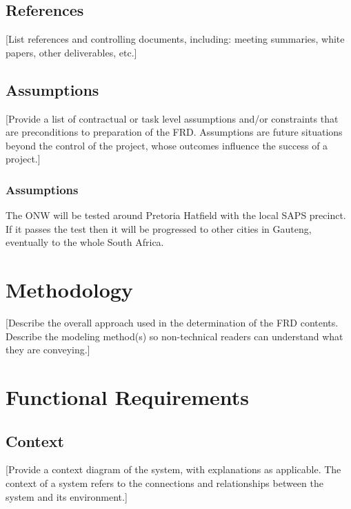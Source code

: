 \documentclass[a4paper,12pt]{article}
\begin{document}
\subsection{References}
[List references and controlling documents, including: meeting summaries, white papers, other deliverables, etc.]
\subsection{Assumptions}
[Provide a list of contractual or task level assumptions and/or constraints that are preconditions to preparation of the FRD.  Assumptions are future situations beyond the control of the project, whose outcomes influence the success of a project.]
\subsubsection{Assumptions}
The ONW will be tested around Pretoria Hatfield with the local SAPS precinct. If it passes the test then it will be progressed to other cities in Gauteng, eventually to the whole South Africa. 

\section{Methodology}
[Describe the overall approach used in the determination of the FRD contents.  Describe the modeling method(s) so non-technical readers can understand what they are conveying.]

\section{Functional Requirements}
\subsection{Context}
[Provide a context diagram of the system, with explanations as applicable.  The context of a system refers to the connections and relationships between the system and its environment.]
\end{document}
